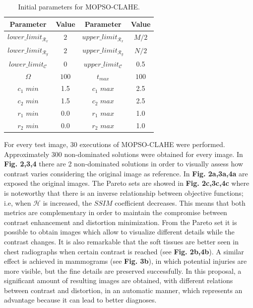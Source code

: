 \documentclass[spanish,twocolumn]{article}
\begin{document}
{\begin{table}[h]
\setlength{\abovecaptionskip}{2pt plus 3pt minus 2pt} %
\caption[Parámetros de entrada para $MOPSO$]{Initial parameters for MOPSO-CLAHE.}
\begin{center}
 \begin{tabular}{||c c | c c||} 
 \hline
 Parameter & Value & Parameter & Value \\ [0.5ex] 
 \hline\hline
 $lower\_limit_{\mathscr{R}_x}$ & $2$ & $upper\_limit_{\mathscr{R}_x}$ & $M/2$ \\ 
 \hline
 $lower\_limit_{\mathscr{R}_y}$ & $2$ & $upper\_limit_{\mathscr{R}_y}$ & $N/2$ \\  
 \hline
 $lower\_limit_{{\mathscr{C}}}$ & $0$ & $upper\_limit_{{\mathscr{C}}}$ & 0.5 \\
\hline
$\Omega$ & $100$ & $t_{max}$ & $100$ \\ 
\hline
$c_1$ $min$ & 1.5 & $c_1$ $max$ & 2.5 \\ 
\hline
$c_2$ $min$ & 1.5 & $c_2$ $max$ & 2.5 \\ 
\hline
$r_1$ $min$ & 0.0 & $r_1$ $max$ & 1.0 \\ 
\hline
$r_2$ $min$ & 0.0 & $r_2$ $max$ & 1.0 \\
\hline
\end{tabular}
\end{center}
\label{table:parametrospso}
\end{table}

For every test image, 30 executions of MOPSO-CLAHE were performed. Approximately 300 non-dominated solutions were obtained for every image.%
 In \textbf {Fig. 2,3,4} there are 2 non-dominated solutions in order to visually assess how contrast varies considering the original image as reference. In \textbf {Fig. 2a,3a,4a} are exposed the original images. The Pareto sets are showed in \textbf {Fig. 2c,3c,4c} where is noteworthy that there is an inverse relationship between objective functions; i.e, when $\mathscr{H}$ is increased, the $SSIM$ coefficient decreases. This means that both metrics are complementary in order to maintain the compromise between contrast enhancement and distortion minimization. From the Pareto set it is possible to obtain images which allow to visualize different details while the contrast changes. It is also remarkable that the soft tissues are better seen in chest radiographs when certain contrast is reached (see \textbf {Fig. 2b,4b}). A similar effect is achieved in mammograms (see \textbf {Fig. 3b}), in which potential injuries are more visible, but the fine details are preserved successfully. In this proposal, a significant amount of resulting images are obtained, with different relations between contrast and distortion, in an automatic manner, which represents an advantage because it can lead to better diagnoses.


}
\end{document}
